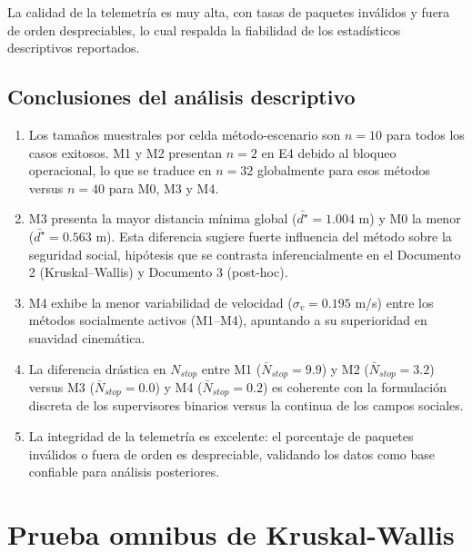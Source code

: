\documentclass[12pt,a4paper,oneside]{book}
\begin{document}
La calidad de la telemetría es muy alta, con tasas de paquetes inválidos y fuera de orden despreciables, lo cual respalda la fiabilidad de los estadísticos descriptivos reportados.

\section{Conclusiones del análisis descriptivo}

\begin{enumerate}[leftmargin=*]
    \item Los tamaños muestrales por celda método-escenario son $n=10$ para todos los casos exitosos. M1 y M2 presentan $n=2$ en E4 debido al bloqueo operacional, lo que se traduce en $n=32$ globalmente para esos métodos versus $n=40$ para M0, M3 y M4.
    
    \item M3 presenta la mayor distancia mínima global ($\bar{d^\star}=1.004$ m) y M0 la menor ($\bar{d^\star}=0.563$ m). Esta diferencia sugiere fuerte influencia del método sobre la seguridad social, hipótesis que se contrasta inferencialmente en el Documento 2 (Kruskal--Wallis) y Documento 3 (post-hoc).
    
    \item M4 exhibe la menor variabilidad de velocidad ($\sigma_v=0.195$ m/s) entre los métodos socialmente activos (M1--M4), apuntando a su superioridad en suavidad cinemática.
    
    \item La diferencia drástica en $N_{stop}$ entre M1 ($\bar{N}_{stop}=9.9$) y M2 ($\bar{N}_{stop}=3.2$) versus M3 ($\bar{N}_{stop}=0.0$) y M4 ($\bar{N}_{stop}=0.2$) es coherente con la formulación discreta de los supervisores binarios versus la continua de los campos sociales.
    
    \item La integridad de la telemetría es excelente: el porcentaje de paquetes inválidos o fuera de orden es despreciable, validando los datos como base confiable para análisis posteriores.
\end{enumerate}



\chapter{Prueba omnibus de Kruskal-Wallis}
\label{chap:kruskal}
\end{document}
